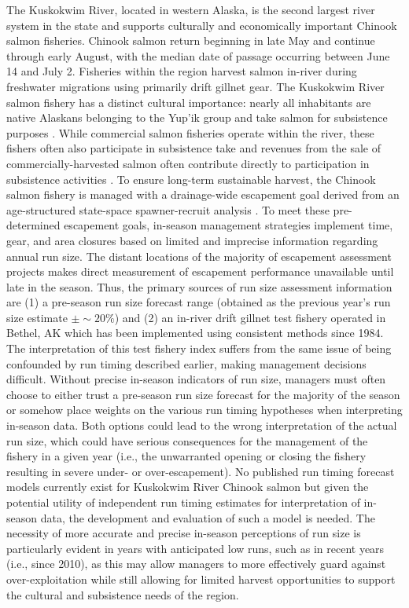 \documentclass[12pt,]{book}
\theoremstyle{definition}
\theoremstyle{definition}
\theoremstyle{definition}
\theoremstyle{remark}
\begin{document}
The Kuskokwim River, located in western Alaska, is the second largest
river system in the state and supports culturally and economically
important Chinook salmon fisheries. Chinook salmon return beginning in
late May and continue through early August, with the median date of
passage occurring between June 14 and July 2. Fisheries within the
region harvest salmon in-river during freshwater migrations using
primarily drift gillnet gear. The Kuskokwim River salmon fishery has a
distinct cultural importance: nearly all inhabitants are native Alaskans
belonging to the Yup'ik group and take salmon for subsistence purposes
\citep{linderman-bergstrom-2009}. While commercial salmon fisheries
operate within the river, these fishers often also participate in
subsistence take and revenues from the sale of commercially-harvested
salmon often contribute directly to participation in subsistence
activities \citep{wolfe-spaeder-2009}. To ensure long-term sustainable
harvest, the Chinook salmon fishery is managed with a drainage-wide
escapement goal derived from an age-structured state-space
spawner-recruit analysis \citep{hamazaki-etal-2012, staton-etal-2017a}.
To meet these pre-determined escapement goals, in-season management
strategies implement time, gear, and area closures based on limited and
imprecise information regarding annual run size. The distant locations
of the majority of escapement assessment projects makes direct
measurement of escapement performance unavailable until late in the
season. Thus, the primary sources of run size assessment information are
(1) a pre-season run size forecast range (obtained as the previous
year's run size estimate \(\pm \sim 20\%\)) and (2) an in-river drift
gillnet test fishery operated in Bethel, AK which has been implemented
using consistent methods since 1984. The interpretation of this test
fishery index suffers from the same issue of being confounded by run
timing described earlier, making management decisions difficult. Without
precise in-season indicators of run size, managers must often choose to
either trust a pre-season run size forecast for the majority of the
season or somehow place weights on the various run timing hypotheses
when interpreting in-season data. Both options could lead to the wrong
interpretation of the actual run size, which could have serious
consequences for the management of the fishery in a given year (i.e.,
the unwarranted opening or closing the fishery resulting in severe
under- or over-escapement). No published run timing forecast models
currently exist for Kuskokwim River Chinook salmon but given the
potential utility of independent run timing estimates for interpretation
of in-season data, the development and evaluation of such a model is
needed. The necessity of more accurate and precise in-season perceptions
of run size is particularly evident in years with anticipated low runs,
such as in recent years (i.e., since 2010), as this may allow managers
to more effectively guard against over-exploitation while still allowing
for limited harvest opportunities to support the cultural and
subsistence needs of the region.
\end{document}
